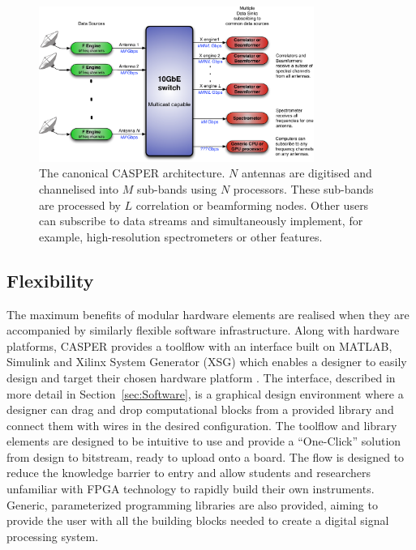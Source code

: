 \documentclass{ws-jai}
\begin{document}
\begin{figure}[htb]
 \centering
 \includegraphics[width=0.8\textwidth]{./figures/ethernet-instrument.pdf}
 \caption{The canonical CASPER architecture. $N$ antennas are digitised and channelised into $M$ sub-bands using $N$ processors. These sub-bands are processed by $L$ correlation or beamforming nodes. Other users can subscribe to data streams and simultaneously implement, for example, high-resolution spectrometers or other features.}
 \label{fig:ethernet-instrument}
\end{figure}



\subsection{Flexibility}

The maximum benefits of modular hardware elements are realised when they are accompanied by similarly flexible software infrastructure. Along with hardware platforms, CASPER provides a toolflow with an interface built on MATLAB, Simulink and Xilinx System Generator (XSG) which enables a designer to easily
design and target their chosen hardware platform \citep{pars05}. The interface, described in more detail in Section~\ref{sec:Software}, 
is a graphical design environment where a designer can drag and
drop computational blocks from a provided library and connect them with wires in the desired configuration.
The toolflow and library elements are designed to be intuitive to use and provide a ``One-Click'' solution from design to
bitstream, ready to upload onto a board. The flow is designed to reduce the knowledge barrier to entry and allow students and researchers unfamiliar with FPGA technology to rapidly build their own instruments.
Generic, parameterized programming libraries are also provided, aiming to provide the user with all the building blocks needed to create a digital signal processing system.
\end{document}
